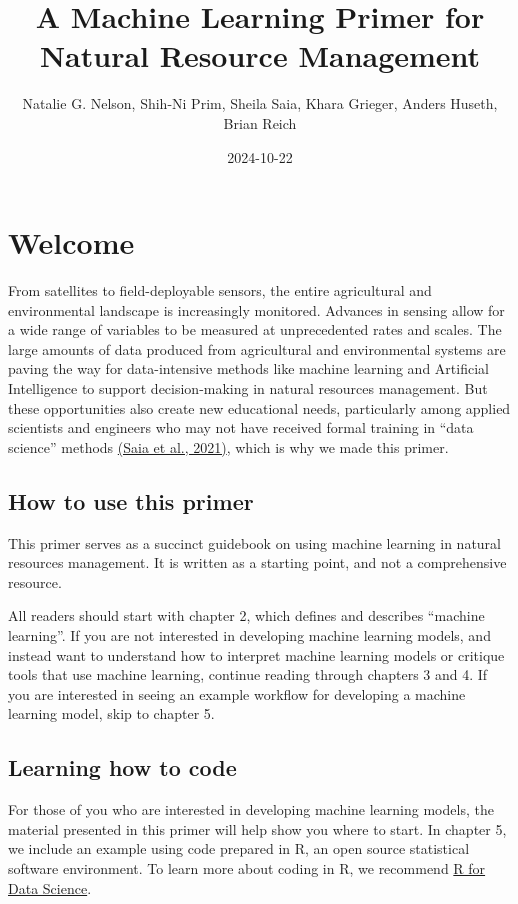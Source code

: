 \documentclass[
]{book}
\title{A Machine Learning Primer for Natural Resource Management}
\author{Natalie G. Nelson, Shih-Ni Prim, Sheila Saia, Khara Grieger, Anders Huseth, Brian Reich}
\date{2024-10-22}
\begin{document}
\maketitle

{
\setcounter{tocdepth}{1}
\tableofcontents
}
\hypertarget{welcome}{%
\chapter{Welcome}\label{welcome}}

From satellites to field-deployable sensors, the entire agricultural and environmental landscape is increasingly monitored. Advances in sensing allow for a wide range of variables to be measured at unprecedented rates and scales. The large amounts of data produced from agricultural and environmental systems are paving the way for data-intensive methods like machine learning and Artificial Intelligence to support decision-making in natural resources management. But these opportunities also create new educational needs, particularly among applied scientists and engineers who may not have received formal training in ``data science'' methods \href{https://doi.org/10.1016/j.ecolmodel.2020.109257}{(Saia et al., 2021)}, which is why we made this primer.

\hypertarget{how-to-use-this-primer}{%
\section{How to use this primer}\label{how-to-use-this-primer}}

This primer serves as a succinct guidebook on using machine learning in natural resources management. It is written as a starting point, and not a comprehensive resource.

All readers should start with chapter 2, which defines and describes ``machine learning''. If you are not interested in developing machine learning models, and instead want to understand how to interpret machine learning models or critique tools that use machine learning, continue reading through chapters 3 and 4. If you are interested in seeing an example workflow for developing a machine learning model, skip to chapter 5.

\hypertarget{learning-how-to-code}{%
\section{Learning how to code}\label{learning-how-to-code}}

For those of you who are interested in developing machine learning models, the material presented in this primer will help show you where to start. In chapter 5, we include an example using code prepared in R, an open source statistical software environment. To learn more about coding in R, we recommend \href{http://r4ds.hadley.nz/}{R for Data Science}.
\end{document}

